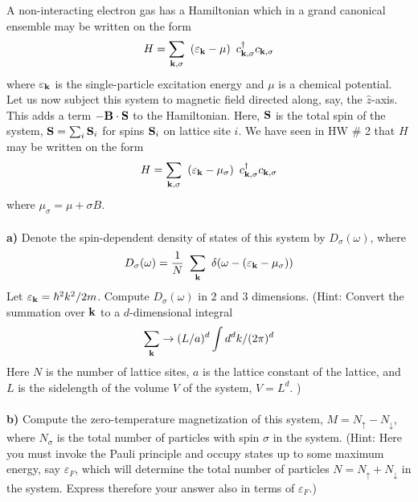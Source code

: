\begin{problem}
	
	A non-interacting electron gas has a Hamiltonian which in a grand canonical ensemble may be written on the form
	\begin{eqnarray}
		H = \sum_{{\bf k},\sigma} ~ \left( \varepsilon_{{\bf k}} - \mu \right) ~ c^{\dagger}_{{\bf k}, \sigma}    c_{{\bf k}, \sigma}   \nonumber
	\end{eqnarray}
	where $\varepsilon_{{\bf k}}$ is the single-particle excitation energy and $\mu$ is a chemical potential. Let us now subject this system to magnetic field directed along, say, the $\hat z$-axis. This adds a term $- {\bf B}\cdot {\bf S}$ to the Hamiltonian. Here, ${\bf S}$ is the total spin of the system, ${\bf S} = \sum_i {\bf S}_i$ for spins ${\bf S}_i$ on lattice site $i$. 
	We have seen in HW $\#$ 2 that  $H$ may be written on the form
	\begin{eqnarray}
		H = \sum_{{\bf k},\sigma} ~ \left( \varepsilon_{{\bf k}} - \mu_\sigma \right) ~ c^{\dagger}_{{\bf k}, \sigma}    c_{{\bf k}, \sigma}   \nonumber
	\end{eqnarray}
	where $\mu_\sigma = \mu + \sigma B$.
	\ \\
	\ \\
	{\bf a)} Denote the spin-dependent density of states of this system by $D_\sigma(\omega)$, where
	\begin{eqnarray}
		D_\sigma(\omega) = \frac{1}{N} ~ \sum_{{\bf k}} ~\delta(\omega -( \varepsilon_{{\bf k}} - \mu_\sigma  )) \nonumber
	\end{eqnarray} 
	Let $\varepsilon_{{\bf k}} = \hbar^2 k^2/2m$. Compute $D_\sigma(\omega)$ in $2$ and $3$ dimensions. (Hint: Convert the summation over ${\bf k}$ to a $d$-dimensional integral 
	$$ \sum_{{\bf k}} \to (L/a)^d \int d^d k/(2\pi)^d$$ 
	Here $N$ is the number of lattice sites, $a$ is the lattice constant of the lattice, and $L$ is the sidelength of the volume $V$ of the system, $V=L^d$. )  
	\ \\
	\ \\
	{\bf b)} Compute the zero-temperature magnetization of this system, $M = N_{\uparrow}- N_{\downarrow}$, where $N_\sigma$ is the total number of particles with spin $\sigma$ in the system. (Hint: Here you must invoke the Pauli principle and occupy states up to some maximum energy, say $\varepsilon_F$, which will determine the total number of particles $N=N_{\uparrow}+ N_{\downarrow}$ in the system. Express therefore your answer also in terms of $\varepsilon_F$.)
\end{problem}

